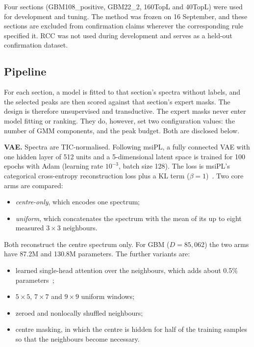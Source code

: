 Four sections (GBM108\_positive, GBM22\_2, 160TopL and 40TopL) were used for
development and tuning. The method was frozen on 16 September, and these
sections are excluded from confirmation claims wherever the corresponding rule
specified it. RCC was not used during development and serves as a held-out
confirmation dataset.

\subsection{Pipeline}
\label{sec:pipeline}
For each section, a model is fitted to that section's spectra without labels,
and the selected peaks are then scored against that section's expert masks. The
design is therefore unsupervised and transductive. The expert masks never
enter model fitting or ranking. They do, however, set two configuration values:
the number of GMM components, and the peak budget. Both are disclosed below.

\textbf{VAE.} Spectra are TIC-normalised. Following msiPL, a fully connected
VAE with one hidden layer of 512 units and a 5-dimensional latent space is
trained for 100 epochs with Adam (learning rate $10^{-3}$, batch size 128). The
loss is msiPL's categorical cross-entropy reconstruction loss plus a KL term
($\beta = 1$)~\citep{abdelmoula2021peak,kingma2014autoencoding}. Two core arms
are compared:
\begin{itemize}
  \item \emph{centre-only}, which encodes one spectrum;
  \item \emph{uniform}, which concatenates the spectrum with the mean of its up
        to eight measured $3\times3$ neighbours.
\end{itemize}
Both reconstruct the centre spectrum only. For GBM ($D=85{,}062$) the two arms
have 87.2M and 130.8M parameters. The further variants are:
\begin{itemize}
  \item learned single-head attention over the neighbours, which adds about
        0.5\% parameters~\citep{vaswani2017attention};
  \item $5\times5$, $7\times7$ and $9\times9$ uniform windows;
  \item zeroed and nonlocally shuffled neighbours;
  \item centre masking, in which the centre is hidden for half of the training
        samples so that the neighbours become necessary.
\end{itemize}

